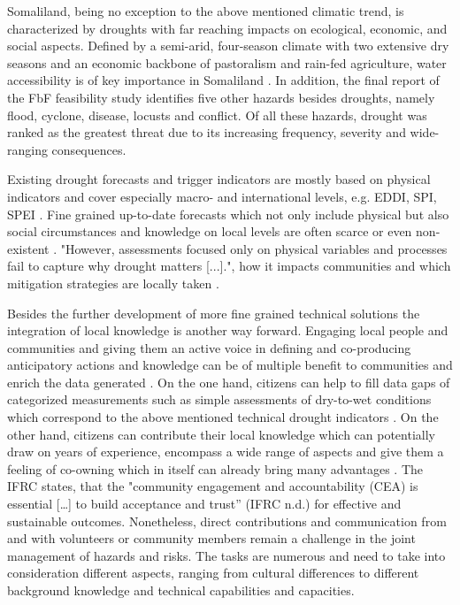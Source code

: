 Somaliland, being no exception to the above mentioned climatic trend, is characterized by droughts with far reaching impacts on ecological, economic, and social aspects. Defined by a semi-arid, four-season climate with two extensive dry seasons and an economic backbone of pastoralism and rain-fed agriculture, water accessibility is of key importance in Somaliland \autocite{abdulkadirAssessmentDroughtRecurrence2017,petrucciLandscapeLandformsNorthern2022,republicofsomalilandSomalilandCountryProfile2021}.
In addition, the final report of the FbF feasibility study identifies five other hazards besides droughts, namely flood, cyclone, disease, locusts and conflict. Of all these hazards, drought was ranked as the greatest threat due to its increasing frequency, severity and wide-ranging consequences.\newline

Existing drought forecasts and trigger indicators are mostly based on physical indicators and cover especially macro- and international levels, e.g. EDDI, SPI, SPEI . Fine grained up-to-date forecasts which not only include physical but also social circumstances and knowledge on local levels are often scarce or even non-existent . "However, assessments focused only on physical variables and processes fail to capture why drought matters [...]."\autocite[3]{lackstromBackyardHydroclimatologyCitizen2022}, how it impacts communities and which mitigation strategies are locally taken .\newline

Besides the further development of more fine grained technical solutions the integration of local knowledge is another way forward. Engaging local people and communities and giving them an active voice in defining and co-producing anticipatory actions and knowledge can be of multiple benefit to communities and enrich the data generated \autocite{somaliredcrescentsocietyFeasibilityStudyPotential2022, njambi-szlapkaIntegratingCommunityVoices}. On the one hand, citizens can help to fill data gaps of categorized measurements such as simple assessments of dry-to-wet conditions which correspond to the above mentioned technical drought indicators \autocite{lackstromBackyardHydroclimatologyCitizen2022}. On the other hand, citizens can contribute their local knowledge which can potentially draw on years of experience, encompass a wide range of aspects and give them a feeling of co-owning which in itself can already bring many advantages \autocite{njambi-szlapkaIntegratingCommunityVoices}. The IFRC states, that the "community engagement and accountability (CEA) is essential […] to build acceptance and trust” \autocite{ifrcCommunityEngagementAccountability}(IFRC n.d.) for effective and sustainable outcomes. 
Nonetheless, direct contributions and communication from and with volunteers or community members remain a challenge in the joint management of hazards and risks. The tasks are numerous and need to take into consideration different aspects, ranging from cultural differences to different background knowledge and technical capabilities and capacities.

